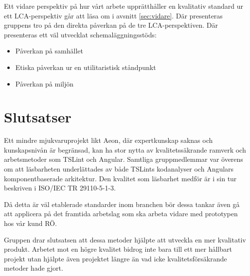 Ett vidare perspektiv på hur vårt arbete upprätthåller en kvalitativ standard ur ett LCA-perspektiv går att läsa om i avsnitt \ref{sec:vidare}. Där presenteras gruppens tro på den direkta påverkan på de tre LCA-perspektiven. Där presenteras ett väl utvecklat schemaläggningsstöds:

\begin{itemize}
	\item Påverkan på samhället
	\item Etiska påverkan ur en utilitaristisk ståndpunkt
	\item Påverkan på miljön
\end{itemize}

\section{Slutsatser}

Ett mindre mjukvaruprojekt likt Aeon, där expertkunskap saknas och kunskapsnivån är begränsad, kan ha stor nytta av kvalitetssäkrande ramverk och arbetsmetoder som TSLint och Angular. 
Samtliga gruppmedlemmar var överens om att läsbarheten underlättades av både TSLints kodanalyser och Angulars komponentbaserade arkitektur.
Den kvalitet som läsbarhet medför är i sin tur beskriven i ISO/IEC TR 29110-5-1-3.

Då detta är väl etablerade standarder inom branchen bör dessa tankar även gå att applicera på det framtida arbetslag som ska arbeta vidare med prototypen hos vår kund RÖ. 

Gruppen drar slutsatsen att dessa metoder hjälpte att utveckla en mer kvalitativ produkt. Arbetet mot en högre kvalitet bidrog inte bara till ett mer hållbart projekt utan hjälpte även projektet längre än vad icke kvalitetsförsäkrande metoder hade gjort.

